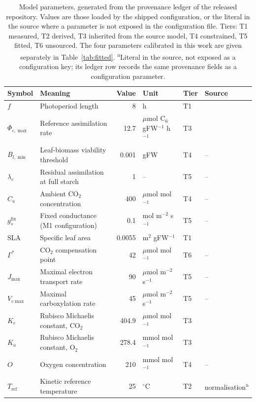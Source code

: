 \begin{table}[!htbp]
\centering
\scriptsize
\caption{Model parameters, generated from the provenance ledger of the released
repository. Values are those loaded by the shipped configuration, or the literal
in the source where a parameter is not exposed in the configuration file. Tiers:
T1 measured, T2 derived, T3 inherited from the source model, T4 constrained,
T5 fitted, T6 unsourced. The four parameters
calibrated in this work are given separately in Table~\ref{tab:fitted}.
\textsuperscript{a}Literal in the source, not exposed as a configuration key;
its ledger row records the same provenance fields as a configuration parameter.}
\label{tab:params}
\begin{tabular}{@{}llrlll@{}}
\toprule
Symbol & Meaning & Value & Unit & Tier & Source \\
\midrule
$f$ & Photoperiod length & 8 & h & T1 & \citet{Sulpice2014} \\
$\Phi_{c,\max}$ & Reference assimilation rate & 12.7 & $\mu$mol C$_6$ gFW$^{-1}$ h$^{-1}$ & T3 & \citet{Tedone2020} \\
$B_{l,\min}$ & Leaf-biomass viability threshold & 0.001 & gFW & T4 & -- \\
$\lambda_c$ & Residual assimilation at full starch & 1 & -- & T5 & -- \\
$C_a$ & Ambient CO$_2$ concentration & 400 & $\mu$mol mol$^{-1}$ & T4 & -- \\
$g_s^{\mathrm{fix}}$ & Fixed conductance (M1 configuration) & 0.1 & mol m$^{-2}$ s$^{-1}$ & T5 & -- \\
SLA & Specific leaf area & 0.0055 & m$^2$ gFW$^{-1}$ & T1 & \citet{Tolleter2024} \\
$\Gamma^{*}$ & CO$_2$ compensation point & 42 & $\mu$mol mol$^{-1}$ & T6 & -- \\
$J_{\max}$ & Maximal electron transport rate & 90 & $\mu$mol m$^{-2}$ s$^{-1}$ & T5 & -- \\
$V_{c\max}$ & Maximal carboxylation rate & 45 & $\mu$mol m$^{-2}$ s$^{-1}$ & T5 & -- \\
$K_c$ & Rubisco Michaelis constant, CO$_2$ & 404.9 & $\mu$mol mol$^{-1}$ & T3 & \citet{Bernacchi2001} \\
$K_o$ & Rubisco Michaelis constant, O$_2$ & 278.4 & mmol mol$^{-1}$ & T3 & \citet{Bernacchi2001} \\
$O$ & Oxygen concentration & 210 & mmol mol$^{-1}$ & T4 & -- \\
$T_{\mathrm{ref}}$ & Kinetic reference temperature & 25 & $^\circ$C & T2 & normalisation\textsuperscript{a} \\

\end{tabular}
\end{table}
